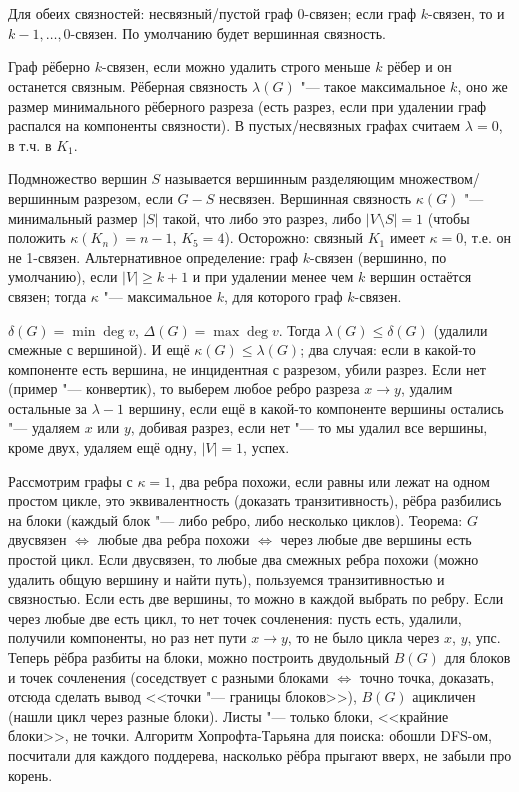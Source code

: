 \section{} %
	Для обеих связностей:
	несвязный/пустой граф 0-связен;
	если граф $k$-связен, то и $k-1, \dots, 0$-связен.
	По умолчанию будет вершинная связность.

	Граф рёберно $k$-связен, если можно удалить строго меньше $k$ рёбер и он останется связным.
	Рёберная связность $\lambda(G)$ "--- такое максимальное $k$, оно же
	размер минимального рёберного разреза (есть разрез, если при удалении граф распался на компоненты связности).
	В пустых/несвязных графах считаем $\lambda=0$, в т.ч. в $K_1$.

	Подмножество вершин $S$ называется вершинным разделяющим множеством/вершинным разрезом,
	если $G-S$ несвязен.
	Вершинная связность $\kappa(G)$ "--- минимальный размер $|S|$ такой, что либо это разрез,
	либо $|V\setminus S|=1$ (чтобы положить $\kappa(K_n)=n-1$, $K_5=4$).
	Осторожно: связный $K_1$ имеет $\kappa=0$, т.е. он не 1-связен.
	Альтернативное определение: граф $k$-связен (вершинно, по умолчанию), если $|V|\ge k+1$
	и при удалении менее чем $k$ вершин остаётся связен;
	тогда $\kappa$ "--- максимальное $k$, для которого граф $k$-связен.

	$\delta(G) = \min \deg v$, $\Delta(G) = \max\deg v$.
	Тогда $\lambda(G)\le\delta(G)$ (удалили смежные с вершиной).
	И ещё $\kappa(G)\le \lambda(G)$; два случая: если в какой-то компоненте есть вершина,
	не инцидентная с разрезом, убили разрез.
	Если нет (пример "--- конвертик), то выберем любое ребро разреза $x \to y$,
	удалим остальные за $\lambda-1$ вершину, если ещё в какой-то компоненте вершины остались "--- удаляем $x$ или $y$, добивая разрез,
	если нет "--- то мы удалил все вершины, кроме двух, удаляем ещё одну, $|V|=1$, успех.

	Рассмотрим графы с $\kappa=1$, два ребра похожи, если равны или лежат на одном простом цикле,
	это эквивалентность (доказать транзитивность), рёбра разбились на блоки (каждый блок "--- либо ребро, либо несколько циклов).
	Теорема: $G$ двусвязен $\iff$ любые два ребра похожи $\iff$ через любые две вершины есть простой цикл.
	Если двусвязен, то любые два смежных ребра похожи (можно удалить общую вершину и найти путь), пользуемся транзитивностью и связностью.
	Если есть две вершины, то можно в каждой выбрать по ребру.
	Если через любые две есть цикл, то нет точек сочленения: пусть есть, удалили,
	получили компоненты, но раз нет пути $x \to y$, то не было цикла через $x$, $y$, упс.
	Теперь рёбра разбиты на блоки, можно построить двудольный $B(G)$ для блоков и точек сочленения (соседствует с разными блоками $\iff$ точно точка, доказать,
	отсюда сделать вывод <<точки "--- границы блоков>>), $B(G)$ ацикличен (нашли цикл через разные блоки).
	Листы "--- только блоки, <<крайние блоки>>, не точки.
	Алгоритм Хопрофта-Тарьяна для поиска: обошли DFS-ом, посчитали для каждого поддерева, насколько рёбра прыгают вверх, не забыли про корень.

